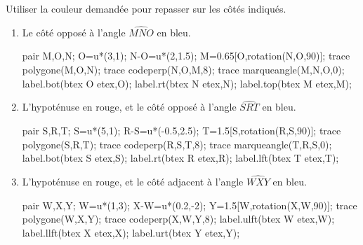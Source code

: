 \begin{exercice*}
    Utiliser la couleur demandée pour repasser sur les côtés indiqués.
    \begin{enumerate}
        \item Le côté opposé à l'angle $\widehat{MNO}$ en bleu.
        
        \medskip        
        \begin{Geometrie}[CoinHD={(6u,4.5u)}]        
            pair M,O,N;
            O=u*(3,1);
            N-O=u*(2,1.5);
            M=0.65[O,rotation(N,O,90)];
            trace polygone(M,O,N);            
            trace codeperp(N,O,M,8);        
            trace marqueangle(M,N,O,0);
            label.bot(btex O etex,O);
            label.rt(btex N etex,N);
            label.top(btex M etex,M);
        \end{Geometrie}
        \item L'hypoténuse en rouge, et le côté opposé à l'angle $\widehat{SRT}$ en bleu.
        
        \medskip        
        \begin{Geometrie}[CoinHD={(6u,4.5u)}]        
            pair S,R,T;
            S=u*(5,1);
            R-S=u*(-0.5,2.5);
            T=1.5[S,rotation(R,S,90)];
            trace polygone(S,R,T);            
            trace codeperp(R,S,T,8);        
            trace marqueangle(T,R,S,0);
            label.bot(btex S etex,S);
            label.rt(btex R etex,R);
            label.lft(btex T etex,T);
        \end{Geometrie}
        \item L'hypoténuse en rouge, et le côté adjacent à l'angle $\widehat{WXY}$ en bleu.
        
        \medskip        
        \begin{Geometrie}[CoinHD={(6u,4.5u)}]        
            pair W,X,Y;
            W=u*(1,3);
            X-W=u*(0.2,-2);
            Y=1.5[W,rotation(X,W,90)];
            trace polygone(W,X,Y);            
            trace codeperp(X,W,Y,8);
            label.ulft(btex W etex,W);
            label.llft(btex X etex,X);
            label.urt(btex Y etex,Y);
        \end{Geometrie}
    \end{enumerate}
\end{exercice*}
